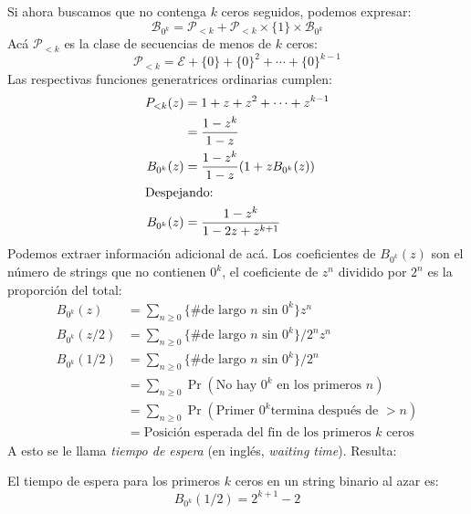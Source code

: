   Si ahora buscamos que no contenga \(k\) ceros seguidos,
  podemos expresar:
  \begin{equation*}
    \mathcal{B}_{0^k}
      = \mathcal{P}_{< k}
	  + \mathcal{P}_{< k}
	      \times \{ 1 \} \times \mathcal{B}_{0^k}
  \end{equation*}
  Acá \(\mathcal{P}_{< k}\)
  es la clase de secuencias de menos de \(k\) ceros:
  \begin{equation*}
    \mathcal{P}_{< k}
      = \mathcal{E} + \{0\} + \{0\}^2 + \dotsb + \{0\}^{k - 1}
  \end{equation*}
  Las respectivas funciones generatrices ordinarias cumplen:
  \begin{align}
    P_{< k} (z)
      &= 1 + z + z^2 + \dotsb + z^{k - 1} \notag \\
      &= \frac{1 - z^k}{1 - z} \notag \\
    B_{0^k} (z)
      &= \frac{1 - z^k}{1 - z} (1 + z B_{0^k} (z)) \notag \\
  \intertext{Despejando:}
    B_{0^k} (z)
      &= \frac{1 - z^k}{1 - 2 z + z^{k + 1}}
	   \label{eq:B0^k}
  \end{align}
  Podemos extraer información adicional de acá.
  Los coeficientes de \(B_{0^k}(z)\)
  son el número de \foreignlanguage{english}{strings}
  que no contienen \(0^k\),
  el coeficiente de \(z^n\)
  dividido por \(2^n\) es la proporción del total:
  \begin{align*}
    B_{0^k}(z)
      &= \sum_{n \ge 0}
	   \text{\{\# de largo \(n\) sin \(0^k\)\}} z^n \\
    B_{0^k}(z / 2)
      &= \sum_{n \ge 0}
	   \text{\{\# de largo \(n\) sin \(0^k\)\}} / 2^n z^n \\
    B_{0^k}(1 / 2)
      &= \sum_{n \ge 0}
	   \text{\{\# de largo \(n\) sin \(0^k\)\}} / 2^n \\
      &= \sum_{n \ge 0}
	   \Pr( \text{No hay \(0^k\) en los primeros \(n\)}) \\
      &= \sum_{n \ge 0}
	   \Pr( \text{Primer \(0^k\)
		      termina después de \({} > n\)} ) \\
      &= \text{Posición esperada
	       del fin de los primeros \(k\) ceros}
  \end{align*}
  A esto se le llama \emph{tiempo de espera}%
  (en inglés,
   \emph{\foreignlanguage{english}{waiting time}}).%
  Resulta:
  \begin{theorem}
    \label{theo:waiting-time-2^k}
    El tiempo de espera para los primeros \(k\) ceros
    en un \foreignlanguage{english}{string} binario al azar es:
    \begin{equation}
      \label{eq:waiting-time-2^k}
      B_{0^k}(1/2)
	= 2^{k + 1} - 2
    \end{equation}
  \end{theorem}
